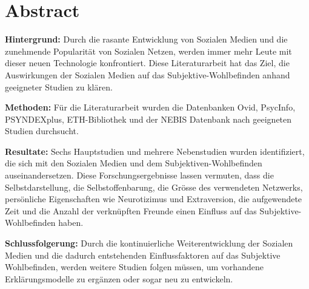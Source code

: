 %
%
\thispagestyle{empty} 
\chapter*{Abstract}\label{abstract}
\textbf{Hintergrund:} Durch die rasante Entwicklung von Sozialen Medien und die zunehmende Popularität von Sozialen Netzen, werden immer mehr Leute mit dieser neuen Technologie konfrontiert. Diese Literaturarbeit hat das Ziel, die Auswirkungen der Sozialen Medien auf das Subjektive-Wohlbefinden anhand geeigneter Studien zu klären. \par 
\textbf{Methoden:} Für die Literaturarbeit wurden die Datenbanken Ovid, PsycInfo, PSYNDEXplus, ETH-Bibliothek und der NEBIS Datenbank nach geeigneten Studien durchsucht.\par 
\textbf{Resultate:} Sechs Hauptstudien und mehrere Nebenstudien wurden identifiziert, die sich mit den Sozialen Medien und dem Subjektiven-Wohlbefinden auseinandersetzen. Diese Forschungsergebnisse lassen vermuten, dass die Selbstdarstellung, die Selbstoffenbarung, die Grösse des verwendeten Netzwerks, persönliche Eigenschaften wie Neurotizimus und Extraversion, die aufgewendete Zeit und die Anzahl der verknüpften Freunde einen Einfluss auf das Subjektive-Wohlbefinden haben.\par 
\textbf{Schlussfolgerung:} Durch die kontinuierliche Weiterentwicklung der Sozialen Medien und die dadurch entstehenden Einflussfaktoren auf das Subjektive Wohlbefinden, werden weitere Studien folgen müssen, um vorhandene Erklärungsmodelle zu ergänzen oder sogar neu zu entwickeln.\par 

